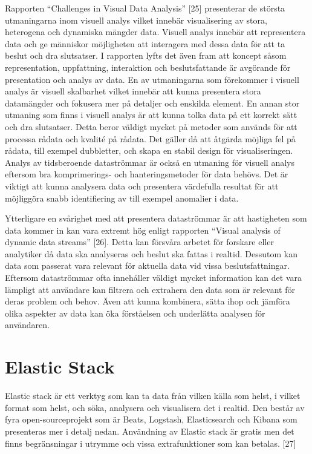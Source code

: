 \documentclass[12pt]{kththesis}
\begin{document}
Rapporten “Challenges in Visual Data Analysis” [25] presenterar de största utmaningarna inom visuell analys vilket innebär visualisering av stora, heterogena och dynamiska mängder data. Visuell analys innebär att representera data och ge människor möjligheten att interagera med dessa data för att ta beslut och dra slutsatser. I rapporten lyfts det även fram att koncept såsom representation, uppfattning, interaktion och beslutsfattande är avgörande för presentation och analys av data. En av utmaningarna som förekommer i visuell analys är visuell skalbarhet vilket innebär att kunna presentera stora datamängder och fokusera mer på detaljer och enskilda element. En annan stor utmaning som finns i visuell analys är att kunna tolka data på ett korrekt sätt och dra slutsatser. Detta beror väldigt mycket på metoder som används för att processa rådata och kvalité på rådata. Det gäller då att åtgärda möjliga fel på rådata, till exempel dubbletter, och skapa en stabil design för visualiseringen. Analys av tidsberoende dataströmmar är också en utmaning för visuell analys eftersom bra komprimerings- och hanteringsmetoder för data behövs. Det är viktigt att kunna analysera data och presentera värdefulla resultat för att möjliggöra snabb identifiering av till exempel anomalier i data. 

Ytterligare en svårighet med att presentera dataströmmar är att hastigheten som data kommer in kan vara extremt hög enligt rapporten “Visual analysis of dynamic data streams” [26]. Detta kan försvåra arbetet för forskare eller analytiker då data ska analyseras och beslut ska fattas i realtid. Dessutom kan data som passerat vara relevant för aktuella data vid vissa beslutsfattningar. Eftersom dataströmmar ofta innehåller väldigt mycket information kan det vara lämpligt att användare kan filtrera och extrahera den data som är relevant för deras problem och behov. Även att kunna kombinera, sätta ihop och jämföra olika aspekter av data kan öka förståelsen och underlätta analysen för användaren. 

\section{Elastic Stack} 

Elastic stack är ett verktyg som kan ta data från vilken källa som helst, i vilket format som helst, och söka, analysera och visualisera det i realtid. Den består av fyra open-sourceprojekt som är Beats, Logstash, Elasticsearch och Kibana som presenteras mer i detalj nedan. Användning av Elastic stack är gratis men det finns begränsningar i utrymme och vissa extrafunktioner som kan betalas. [27]
\end{document}
